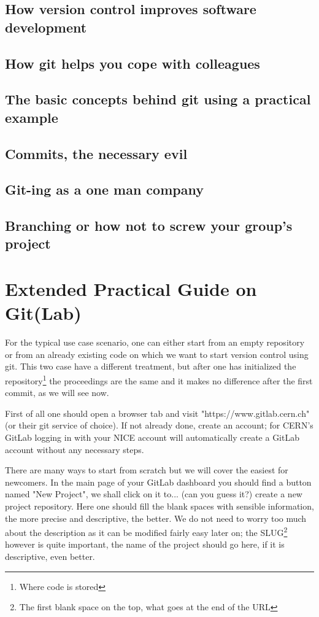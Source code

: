 \documentclass[runningheads,a4paper]{llncs}
\begin{document}
\subsection{How version control improves software development}

\subsection{How git helps you cope with colleagues}

\subsection{The basic concepts behind git using a practical example}

\subsection{Commits, the necessary evil}

\subsection{Git-ing as a one man company}

\subsection{Branching or how not to screw your group's project}

  
\section{Extended Practical Guide on Git(Lab)}

For the typical use case scenario, one can either start from an empty repository or from an already existing code on which we want to start version control using git. This two case have a different treatment, but after one has initialized the repository\footnote{Where code is stored} the proceedings are the same and it makes no difference after the first commit, as we will see now. 

 First of all one should open a browser tab and visit "https://www.gitlab.cern.ch" (or their git service of choice). If not already done, create an account; for CERN's GitLab logging in with your NICE account will automatically create a GitLab account without any necessary steps.

There are many ways to start from scratch but we will cover the easiest for newcomers. In the main page of your GitLab dashboard you should find a button named "New Project", we shall click on it to... (can you guess it?) create a new project repository. Here one should fill the blank spaces with sensible information, the more precise and descriptive, the better. We do not need to worry too much about the description as it can be modified fairly easy later on; the SLUG\footnote{The first blank space on the top, what goes at the end of the URL} however is quite important, the name of the project should go here, if it is descriptive, even better.
\end{document}
